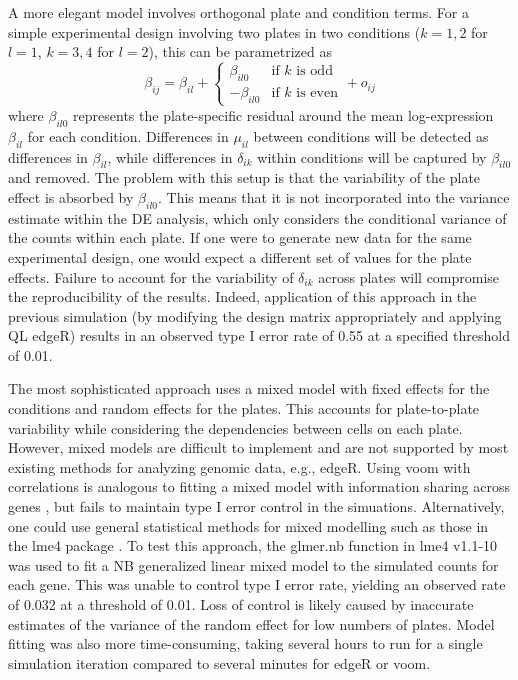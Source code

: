 \documentclass{article}
\begin{document}
A more elegant model involves orthogonal plate and condition terms.
For a simple experimental design involving two plates in two conditions ($k=1,2$ for $l=1$, $k=3,4$ for $l=2$), this can be parametrized as
\[
    \beta_{ij} = \beta_{il} + 
    \begin{cases} 
        \beta_{il0} & \mbox{if $k$ is odd} \\
        - \beta_{il0} & \mbox{if $k$ is even}
    \end{cases}
    + o_{ij}
\]
where $\beta_{il0}$ represents the plate-specific residual around the mean log-expression $\beta_{il}$ for each condition.
Differences in $\mu_{il}$ between conditions will be detected as differences in $\beta_{il}$, 
    while differences in $\delta_{ik}$ within conditions will be captured by $\beta_{il0}$ and removed.
The problem with this setup is that the variability of the plate effect is absorbed by $\beta_{il0}$.
This means that it is not incorporated into the variance estimate within the DE analysis, which only considers the conditional variance of the counts within each plate.
If one were to generate new data for the same experimental design, one would expect a different set of values for the plate effects.
Failure to account for the variability of $\delta_{ik}$ across plates will compromise the reproducibility of the results.
Indeed, application of this approach in the previous simulation (by modifying the design matrix appropriately and applying QL edgeR)
    results in an observed type I error rate of 0.55 at a specified threshold of 0.01.

The most sophisticated approach uses a mixed model with fixed effects for the conditions and random effects for the plates.
This accounts for plate-to-plate variability while considering the dependencies between cells on each plate.
However, mixed models are difficult to implement and are not supported by most existing methods for analyzing genomic data, e.g., edgeR.
Using voom with correlations is analogous to fitting a mixed model with information sharing across genes \cite{smyth2005limma}, 
    but fails to maintain type I error control in the simuations.
Alternatively, one could use general statistical methods for mixed modelling such as those in the lme4 package \cite{bates2015fitting}.
To test this approach, the glmer.nb function in lme4 v1.1-10 was used to fit a NB generalized linear mixed model to the simulated counts for each gene.
This was unable to control type I error rate, yielding an observed rate of 0.032 at a threshold of 0.01.
Loss of control is likely caused by inaccurate estimates of the variance of the random effect for low numbers of plates.
Model fitting was also more time-consuming, taking several hours to run for a single simulation iteration compared to several minutes for edgeR or voom.
\end{document}
